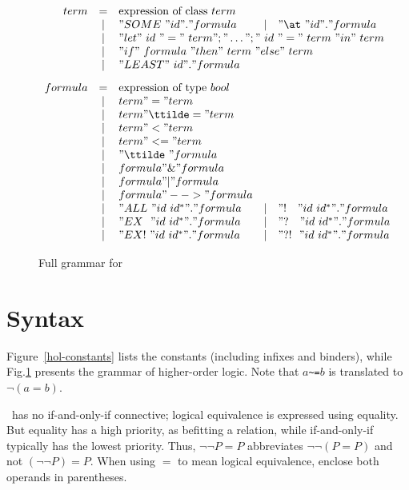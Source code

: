 \begin{figure}
\dquotes
\[\begin{array}{rclcl}
    term & = & \hbox{expression of class~$term$} \\
         & | & "SOME~" id " . " formula
         & | & "\at~" id " . " formula \\
         & | & 
    \multicolumn{3}{l}{"let"~id~"="~term";"\dots";"~id~"="~term~"in"~term} \\
         & | & 
    \multicolumn{3}{l}{"if"~formula~"then"~term~"else"~term} \\
         & | & "LEAST"~ id " . " formula \\[2ex]
 formula & = & \hbox{expression of type~$bool$} \\
         & | & term " = " term \\
         & | & term " \ttilde= " term \\
         & | & term " < " term \\
         & | & term " <= " term \\
         & | & "\ttilde\ " formula \\
         & | & formula " \& " formula \\
         & | & formula " | " formula \\
         & | & formula " --> " formula \\
         & | & "ALL~" id~id^* " . " formula
         & | & "!~~~" id~id^* " . " formula \\
         & | & "EX~~" id~id^* " . " formula 
         & | & "?~~~" id~id^* " . " formula \\
         & | & "EX!~" id~id^* " . " formula
         & | & "?!~~" id~id^* " . " formula \\
  \end{array}
\]
\caption{Full grammar for \HOL} \label{hol-grammar}
\end{figure} 


\section{Syntax}

Figure~\ref{hol-constants} lists the constants (including infixes and
binders), while Fig.\ts\ref{hol-grammar} presents the grammar of
higher-order logic.  Note that $a$\verb|~=|$b$ is translated to
$\lnot(a=b)$.

\begin{warn}
  \HOL\ has no if-and-only-if connective; logical equivalence is expressed
  using equality.  But equality has a high priority, as befitting a
  relation, while if-and-only-if typically has the lowest priority.  Thus,
  $\lnot\lnot P=P$ abbreviates $\lnot\lnot (P=P)$ and not $(\lnot\lnot P)=P$.
  When using $=$ to mean logical equivalence, enclose both operands in
  parentheses.
\end{warn}

